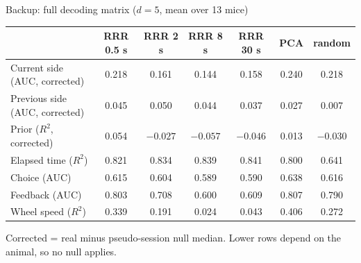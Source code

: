 \documentclass[aspectratio=169,11pt]{beamer}
\newcommand{\muted}[1]{{\color{cInk}#1}}
\newcommand{\Rsq}{$R^2$}
\begin{document}
\begin{frame}{Backup: full decoding matrix ($d = 5$, mean over 13 mice)}
\centering
\small
\setlength{\tabcolsep}{4pt}
\begin{tabular}{@{}lcccccc@{}}
\toprule
 & RRR 0.5 s & RRR 2 s & RRR 8 s & RRR 30 s & PCA & random \\
\midrule
Current side (AUC, corrected) & 0.218 & 0.161 & 0.144 & 0.158 & 0.240 & 0.218 \\
Previous side (AUC, corrected) & 0.045 & 0.050 & 0.044 & 0.037 & 0.027 & 0.007 \\
Prior (\Rsq{}, corrected) & 0.054 & $-0.027$ & $-0.057$ & $-0.046$ & 0.013 & $-0.030$ \\
Elapsed time (\Rsq{}) & 0.821 & 0.834 & 0.839 & 0.841 & 0.800 & 0.641 \\
\midrule
Choice (AUC) & 0.615 & 0.604 & 0.589 & 0.590 & 0.638 & 0.616 \\
Feedback (AUC) & 0.803 & 0.708 & 0.600 & 0.609 & 0.807 & 0.790 \\
Wheel speed (\Rsq{}) & 0.339 & 0.191 & 0.024 & 0.043 & 0.406 & 0.272 \\
\bottomrule
\end{tabular}

\medskip
\muted{Corrected = real minus pseudo-session null median. Lower rows depend on the animal, so no null applies.}
\end{frame}
\end{document}
